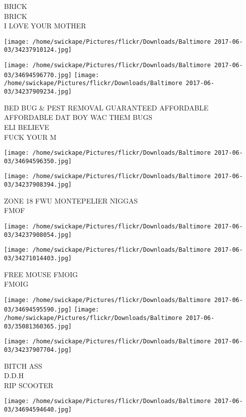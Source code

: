 \documentclass[10pt,letterpaper]{article}
\begin{document}
BRICK\\
BRICK\\
I LOVE YOUR MOTHER
\pagebreak

\texttt{[image: /home/swickape/Pictures/flickr/Downloads/Baltimore 2017-06-03/34237910124.jpg]}

\vspace{0.25in}
\texttt{[image: /home/swickape/Pictures/flickr/Downloads/Baltimore 2017-06-03/34694596770.jpg]}
\texttt{[image: /home/swickape/Pictures/flickr/Downloads/Baltimore 2017-06-03/34237909234.jpg]}

BED BUG \& PEST REMOVAL GUARANTEED AFFORDABLE AFFORDABLE DAT BOY WAC THEM BUGS\\
ELI BELIEVE\\
FUCK YOUR M
\pagebreak

\texttt{[image: /home/swickape/Pictures/flickr/Downloads/Baltimore 2017-06-03/34694596350.jpg]}

\vspace{0.25in}
\texttt{[image: /home/swickape/Pictures/flickr/Downloads/Baltimore 2017-06-03/34237908394.jpg]}

ZONE 18 FWU MONTEPELIER NIGGAS\\
FMOF
\pagebreak

\texttt{[image: /home/swickape/Pictures/flickr/Downloads/Baltimore 2017-06-03/34237908054.jpg]}

\vspace{0.25in}
\texttt{[image: /home/swickape/Pictures/flickr/Downloads/Baltimore 2017-06-03/34271014403.jpg]}

FREE MOUSE FMOIG\\
FMOIG
\pagebreak

\texttt{[image: /home/swickape/Pictures/flickr/Downloads/Baltimore 2017-06-03/34694595590.jpg]}
\texttt{[image: /home/swickape/Pictures/flickr/Downloads/Baltimore 2017-06-03/35081360365.jpg]}

\vspace{0.25in}
\texttt{[image: /home/swickape/Pictures/flickr/Downloads/Baltimore 2017-06-03/34237907704.jpg]}

BITCH ASS\\
D.D.H\\
RIP SCOOTER
\pagebreak

\texttt{[image: /home/swickape/Pictures/flickr/Downloads/Baltimore 2017-06-03/34694594640.jpg]}
\end{document}
